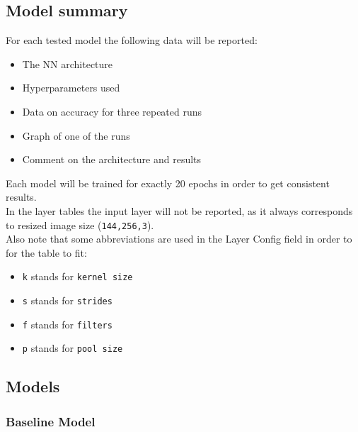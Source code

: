 \documentclass[a4paper,12pt]{article}
\begin{document}
\subsection{Model summary}
For each tested model the following data will be reported:
\begin{itemize}
\item The NN architecture
\item Hyperparameters used
\item Data on accuracy for three repeated runs
\item Graph of one of the runs
\item Comment on the architecture and results
\end{itemize}
Each model will be trained for exactly 20 epochs in order to get consistent results.\\
In the layer tables the input  layer will not be reported, as it always corresponds to resized image size (\texttt{144,256,3}).\\
Also note that some abbreviations are used in the Layer Config field in order to for the table to fit:
\begin{itemize}
\item \texttt{k} stands for \texttt{kernel size}
\item \texttt{s} stands for \texttt{strides}
\item \texttt{f} stands for \texttt{filters}
\item \texttt{p} stands for \texttt{pool size}
\end{itemize}

\newcommand{\conv}{Convolution(\texttt{Conv2d})}
\newcommand{\convP}[3]{\texttt{k=#1, s=#2, f=#3}}
\newcommand{\convKSF}[3]{\convP{#1}{#2}{#3}}

\newcommand{\flt}{Flatten(\texttt{Flatten})}

\newcommand{\dns}{Dense(\texttt{Dense})}
\newcommand{\dnsP}[1]{\texttt{u=#1}}

\newcommand{\pool}{MaxPooling(\texttt{MaxPooling2D})}
\newcommand{\poolN}{\texttt{p=2x2}}

\subsection{Models}

\subsubsection{Baseline Model}

\end{document}
